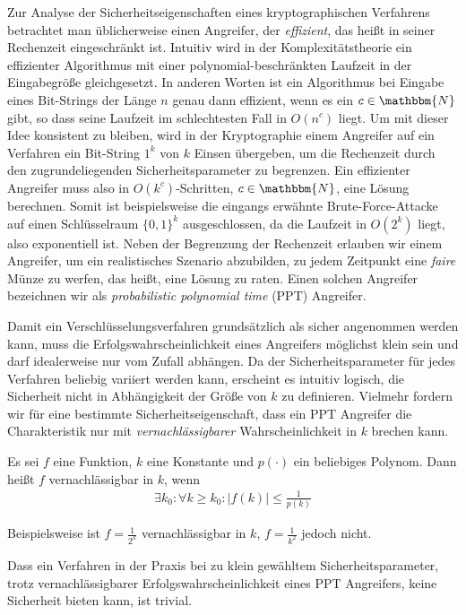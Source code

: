 Zur Analyse der Sicherheitseigenschaften eines kryptographischen Verfahrens betrachtet man üblicherweise einen Angreifer, der \emph{effizient}, das heißt in seiner Rechenzeit eingeschränkt ist. Intuitiv wird in der Komplexitätstheorie ein effizienter Algorithmus mit einer polynomial-beschränkten Laufzeit in der Eingabegröße gleichgesetzt. 
In anderen Worten ist ein Algorithmus bei Eingabe eines Bit-Strings der Länge $n$ genau dann effizient, wenn es ein $c \in \mathbbm{N}$ gibt, so dass seine Laufzeit im schlechtesten Fall in $O(n^c)$ liegt.
Um mit dieser Idee konsistent zu bleiben, wird in der Kryptographie einem Angreifer auf ein Verfahren ein Bit-String $1^k$ von $k$ Einsen übergeben, um die Rechenzeit durch den zugrundeliegenden Sicherheitsparameter zu begrenzen. 
Ein effizienter Angreifer muss also in $O(k^c)$-Schritten, $c \in \mathbbm{N}$, eine Lösung berechnen. Somit ist beispielsweise die eingangs erwähnte Brute-Force-Attacke auf einen Schlüsselraum $\{0, 1\}^{k}$ ausgeschlossen, da die Laufzeit in $O(2^{k})$ liegt, also exponentiell ist.
Neben der Begrenzung der Rechenzeit erlauben wir einem Angreifer, um ein realistisches Szenario abzubilden, zu jedem Zeitpunkt eine \emph{faire} Münze zu werfen, das heißt, eine Lösung zu raten. Einen solchen Angreifer bezeichnen wir als \emph{probabilistic polynomial time} (PPT) Angreifer.

Damit ein Verschlüsselungsverfahren grundsätzlich als sicher angenommen werden kann, muss die Erfolgswahrscheinlichkeit eines Angreifers möglichst klein sein und darf idealerweise nur vom Zufall abhängen.
Da der Sicherheitsparameter für jedes Verfahren beliebig variiert werden kann, erscheint es intuitiv logisch, die Sicherheit nicht in Abhängigkeit der Größe von $k$ zu definieren. Vielmehr fordern wir für eine bestimmte Sicherheitseigenschaft, dass ein PPT Angreifer die Charakteristik nur mit \emph{vernachlässigbarer} Wahrscheinlichkeit in $k$ brechen kann.
\begin{definition}[Vernachlässigbarkeit]
	Es sei $f$ eine Funktion, $k$ eine Konstante und $p(\cdot)$ ein beliebiges Polynom. Dann heißt $f$ vernachlässigbar in $k$, wenn
	\begin{align*}
		\exists k_0 : \forall k \geq k_0 : \vert f(k) \vert \leq \frac{1}{p(k)} 
	\end{align*}
\end{definition}
Beispielsweise ist $f = \frac{1}{2^k}$ vernachlässigbar in $k$, $f = \frac{1}{k^2}$ jedoch nicht.

Dass ein Verfahren in der Praxis bei zu klein gewähltem Sicherheitsparameter, trotz vernachlässigbarer Erfolgswahrscheinlichkeit eines PPT Angreifers, keine Sicherheit bieten kann, ist trivial.